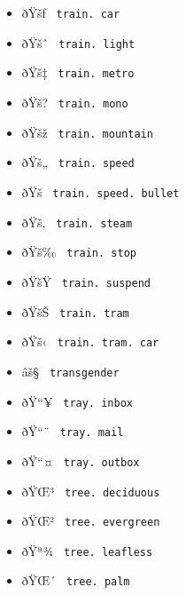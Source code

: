 \begin{itemize}
\item
  \label{symbol-train.car}{{ ðŸšƒ }
  \texttt{\ train.\ car\ }}
\item
  \label{symbol-train.light}{{ ðŸšˆ }
  \texttt{\ train.\ light\ }}
\item
  \label{symbol-train.metro}{{ ðŸš‡ }
  \texttt{\ train.\ metro\ }}
\item
  \label{symbol-train.mono}{{ ðŸš? }
  \texttt{\ train.\ mono\ }}
\item
  \label{symbol-train.mountain}{{ ðŸšž }
  \texttt{\ train.\ mountain\ }}
\item
  \label{symbol-train.speed}{{ ðŸš„ }
  \texttt{\ train.\ speed\ }}
\item
  \label{symbol-train.speed.bullet}{{ ðŸš }
  \texttt{\ train.\ speed.\ bullet\ }}
\item
  \label{symbol-train.steam}{{ ðŸš‚ }
  \texttt{\ train.\ steam\ }}
\item
  \label{symbol-train.stop}{{ ðŸš‰ }
  \texttt{\ train.\ stop\ }}
\item
  \label{symbol-train.suspend}{{ ðŸšŸ }
  \texttt{\ train.\ suspend\ }}
\item
  \label{symbol-train.tram}{{ ðŸšŠ }
  \texttt{\ train.\ tram\ }}
\item
  \label{symbol-train.tram.car}{{ ðŸš‹ }
  \texttt{\ train.\ tram.\ car\ }}
\item
  \label{symbol-transgender}{{ âš§ }
  \texttt{\ transgender\ }}
\item
  \label{symbol-tray.inbox}{{ ðŸ``¥ }
  \texttt{\ tray.\ inbox\ }}
\item
  \label{symbol-tray.mail}{{ ðŸ``¨ }
  \texttt{\ tray.\ mail\ }}
\item
  \label{symbol-tray.outbox}{{ ðŸ``¤ }
  \texttt{\ tray.\ outbox\ }}
\item
  \label{symbol-tree.deciduous}{{ ðŸŒ³ }
  \texttt{\ tree.\ deciduous\ }}
\item
  \label{symbol-tree.evergreen}{{ ðŸŒ² }
  \texttt{\ tree.\ evergreen\ }}
\item
  \label{symbol-tree.leafless}{{ ðŸª¾ }
  \texttt{\ tree.\ leafless\ }}
\item
  \label{symbol-tree.palm}{{ ðŸŒ´ }
  \texttt{\ tree.\ palm\ }}

\end{itemize}
